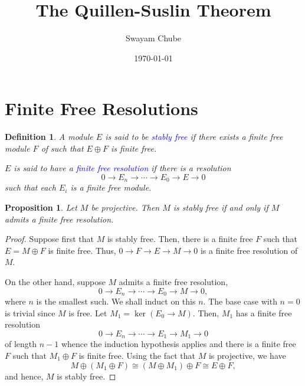 \documentclass[12pt]{article}
\title{The Quillen-Suslin Theorem}
\author{Swayam Chube}
\date{\today}
\theoremstyle{thmstyle}
\newtheorem{proposition}[theorem]{Proposition}
\theoremstyle{defstyle}
\newtheorem{definition}[theorem]{Definition}
\newcommand{\define}[1]{\textcolor{blue}{\textit{#1}}}
\begin{document}
\maketitle

\section{Finite Free Resolutions}

\begin{definition}
    A module $E$ is said to be \define{stably free} if there exists a finite free module $F$ of such that $E\oplus F$ is finite free.

    $E$ is said to have a \define{finite free resolution} if there is a resolution 
    \begin{equation*}
        0\to E_n\to\cdots\to E_0\to E\to 0
    \end{equation*}
    such that each $E_i$ is a finite free module.
\end{definition}

\begin{proposition}
    Let $M$ be projective. Then $M$ is stably free if and only if $M$ admits a finite free resolution.
\end{proposition}
\begin{proof}
    Suppose first that $M$ is stably free. Then, there is a finite free $F$ such that $E = M\oplus F$ is finite free. Thus, $0\to F\to E\to M\to 0$ is a finite free resolution of $M$.

    On the other hand, suppose $M$ admits a finite free resolution, 
    \begin{equation*}
        0\to E_n\to\cdots\to E_0\to M\to 0,
    \end{equation*}
    where $n$ is the smallest such. We shall induct on this $n$. The base case with $n = 0$ is trivial since $M$ is free. Let $M_1 = \ker\left(E_0\to M\right)$. Then, $M_1$ has a finite free resolution 
    \begin{equation*}
        0\to E_n\to\cdots\to E_1\to M_1\to 0
    \end{equation*}
    of length $n - 1$ whence the induction hypothesis applies and there is a finite free $F$ such that $M_1\oplus F$ is finite free. Using the fact that $M$ is projective, we have 
    \begin{equation*}
        M\oplus\left(M_1\oplus F\right)\cong \left(M\oplus M_1\right)\oplus F\cong E\oplus F,
    \end{equation*}
    and hence, $M$ is stably free.
\end{proof}
\end{document}
